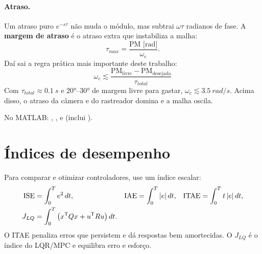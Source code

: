 \paragraph{Atraso.} Um atraso puro $e^{-s\tau}$ não muda o módulo, mas subtrai
$\omega\tau$ radianos de fase. A \textbf{margem de atraso} é o atraso extra que
instabiliza a malha:
\begin{equation}
  \tau_{max} = \frac{\text{PM [rad]}}{\omega_c}.
  \label{eq:margem-atraso}
\end{equation}
\label{sec:regra-banda}
Daí sai a regra prática mais importante deste trabalho:
\begin{equation}
  \boxed{\omega_c \lesssim \frac{\text{PM}_{\text{livre}} - \text{PM}_{\text{desejada}}}{\tau_{total}}}
\end{equation}
Com $\tau_{total}\approx\SI{0,1}{s}$ e \ang{20}--\ang{30} de margem livre para gastar,
$\omega_c\lesssim\SI{3,5}{rad/s}$. Acima disso, o atraso da câmera e do rastreador
domina e a malha oscila.

No MATLAB: , ,
 e  (inclui ).

\section{Índices de desempenho}
Para comparar e otimizar controladores, use um índice escalar:
\begin{align}
  \text{ISE} &= \int_0^{T} e^2\,dt, &
  \text{IAE} &= \int_0^{T} |e|\,dt, &
  \text{ITAE} &= \int_0^{T} t\,|e|\,dt, \\
  J_{LQ} &= \int_0^{T} \left(x^{\mathsf{T}} Q x + u^{\mathsf{T}} R u\right)dt . &&&&
  \label{eq:jlq}
\end{align}
O ITAE penaliza erros que persistem e dá respostas bem amortecidas. O $J_{LQ}$ é o
índice do LQR/MPC e equilibra erro e esforço.


